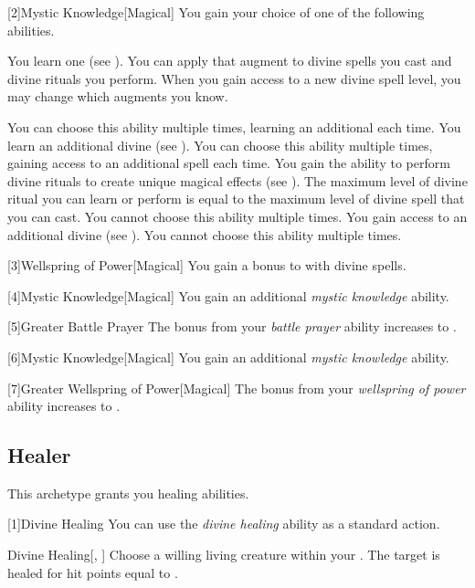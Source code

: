         [2]{Mystic Knowledge}[Magical]
        You gain your choice of one of the following abilities.
        {
             You learn one  (see ).
                You can apply that augment to divine spells you cast and divine rituals you perform.
                When you gain access to a new divine spell level, you may change which augments you know.
                \par You can choose this ability multiple times, learning an additional  each time.
             You learn an additional divine  (see ).
                You can choose this ability multiple times, gaining access to an additional spell each time.
             You gain the ability to perform divine rituals to create unique magical effects (see ).
                The maximum level of divine ritual you can learn or perform is equal to the maximum level of divine spell that you can cast.
                You cannot choose this ability multiple times.
             You gain access to an additional divine  (see ).
                You cannot choose this ability multiple times.
        }

        [3]{Wellspring of Power}[Magical]
        You gain a  bonus to  with divine spells.

        [4]{Mystic Knowledge}[Magical]
        You gain an additional \textit{mystic knowledge} ability.

        [5]{Greater Battle Prayer} The bonus from your \textit{battle prayer} ability increases to .

        [6]{Mystic Knowledge}[Magical]
        You gain an additional \textit{mystic knowledge} ability.

        [7]{Greater Wellspring of Power}[Magical]
        The bonus from your \textit{wellspring of power} ability increases to .

    \subsection{Healer}
        This archetype grants you healing abilities.

        [1]{Divine Healing} You can use the \textit{divine healing} ability as a standard action.
        \begin{freeability}{Divine Healing}[, ]
            Choose a willing living creature within your .
            The target is healed for hit points equal to .
        \end{freeability}

